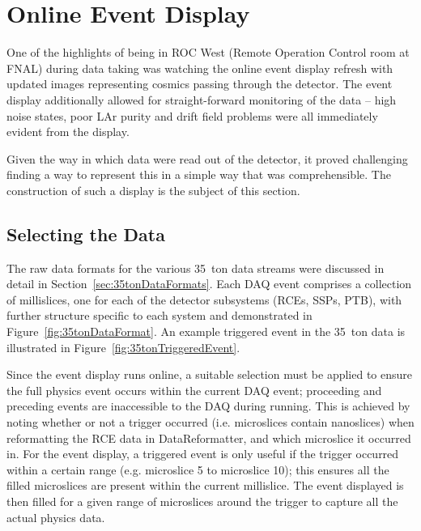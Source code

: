 \section{Online Event Display}\label{sec:EventDisplay}

One of the highlights of being in ROC West (Remote Operation Control room at FNAL) during data taking was watching the online event display refresh with updated images representing cosmics passing through the detector.  The event display additionally allowed for straight-forward monitoring of the data -- high noise states, poor LAr purity and drift field problems were all immediately evident from the display.

Given the way in which data were read out of the detector, it proved challenging finding a way to represent this in a simple way that was comprehensible.  The construction of such a display is the subject of this section.

\subsection{Selecting the Data}\label{sec:SelectingEVDData}

The raw data formats for the various 35~ton data streams were discussed in detail in Section~\ref{sec:35tonDataFormats}.  Each DAQ event comprises a collection of millislices, one for each of the detector subsystems (RCEs, SSPs, PTB), with further structure specific to each system and demonstrated in Figure~\ref{fig:35tonDataFormat}.  An example triggered event in the 35~ton data is illustrated in Figure~\ref{fig:35tonTriggeredEvent}.

Since the event display runs online, a suitable selection must be applied to ensure the full physics event occurs within the current DAQ event; proceeding and preceding events are inaccessible to the DAQ during running.  This is achieved by noting whether or not a trigger occurred (i.e. microslices contain nanoslices) when reformatting the RCE data in DataReformatter, and which microslice it occurred in.  For the event display, a triggered event is only useful if the trigger occurred within a certain range (e.g. microslice 5 to microslice 10); this ensures all the filled microslices are present within the current millislice.  The event displayed is then filled for a given range of microslices around the trigger to capture all the actual physics data.

